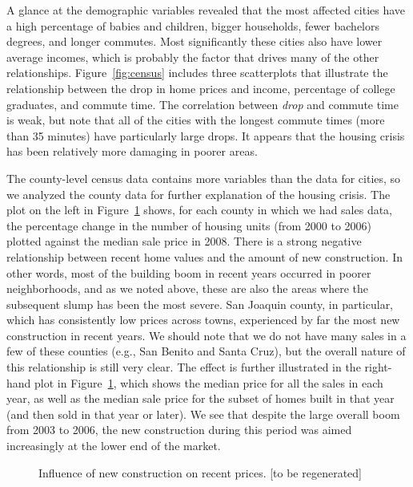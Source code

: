 \documentclass[oneside]{article}
\begin{document}

A glance at the demographic variables revealed that the most affected cities have a high percentage of babies and children, bigger households, fewer bachelors degrees, and longer commutes.  Most significantly these cities also have lower average incomes, which is probably the factor that drives many of the other relationships. Figure~\ref{fig:census} includes three scatterplots that illustrate the relationship between the drop in home prices and income, percentage of college graduates, and commute time.  The correlation between {\em drop} and commute time is weak, but note that all of the cities with the longest commute times (more than 35 minutes) have particularly large drops. It appears that the housing crisis has been relatively more damaging in poorer areas.

The county-level census data contains more variables than the data for cities, so we analyzed the county data for further explanation of the housing crisis. The plot on the left in Figure~\ref{fig:newconstruct} shows, for each county in which we had sales data, the percentage change in the number of housing units (from 2000 to 2006) plotted against the median sale price in 2008. There is a strong negative relationship between recent home values and the amount of new construction. In other words, most of the building boom in recent years occurred in poorer neighborhoods, and as we noted above, these are also the areas where the subsequent slump has been the most severe. San Joaquin county, in particular, which has consistently low prices across towns, experienced by far the most new construction in recent years.  We should note that we do not have many sales in a few of these counties (e.g., San Benito and Santa Cruz), but the overall nature of this relationship is still very clear. The effect is further illustrated in the right-hand plot in Figure~\ref{fig:newconstruct}, which shows the median price for all the sales in each year, as well as the median sale price for the subset of homes built in that year (and then sold in that year or later). We see that despite the large overall boom from 2003 to 2006, the new construction during this period was aimed increasingly at the lower end of the market.  

\begin{figure}[htbp]
  \centering
  \caption{Influence of new construction on recent prices. [to be regenerated]}
  \label{fig:newconstruct}
\end{figure}
\end{document}

